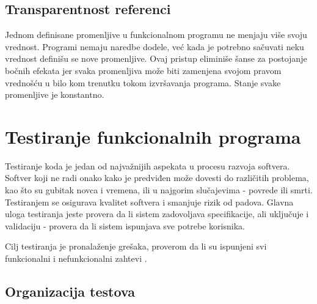 \documentclass[12pt,oneside]{memoir}
\begin{document}
\subsection{Transparentnost referenci}
Jednom definisane promenljive u funkcionalnom programu ne menjaju više svoju vrednost. Programi nemaju naredbe dodele, već kada je potrebno sačuvati neku vrednost definišu se nove promenljive. Ovaj pristup eliminiše šanse za postojanje bočnih efekata jer svaka promenljiva može biti zamenjena svojom pravom vrednošću u bilo kom trenutku tokom izvršavanja programa. Stanje svake promenljive je konstantno. 

\section{Testiranje funkcionalnih programa}
\label{sec:piramid}

\par Testiranje koda je jedan od najvažnijih aspekata u procesu razvoja softvera. Softver koji ne radi onako kako je predviđen može dovesti do različitih problema, kao što su gubitak novca i vremena, ili u najgorim slučajevima - povrede ili smrti. Testiranjem se osigurava kvalitet softvera i smanjuje rizik od padova. Glavna uloga testiranja jeste provera da li sistem zadovoljava specifikacije, ali uključuje i validaciju - provera da li sistem ispunjava sve potrebe korisnika.  
\par Cilj testiranja je pronalaženje grešaka, proverom da li su ispunjeni svi funkcionalni i nefunkcionalni zahtevi \cite{test}. 

\subsection{Organizacija testova}
\end{document}
